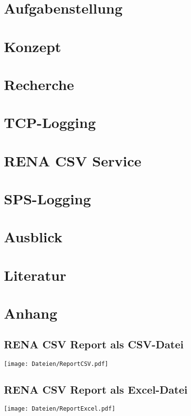 \documentclass[
   ngerman          %
  ,a4paper          %
 ,12pt
]{article} %
\begin{document}
%
%
\section{Aufgabenstellung}

\newpage
\clearpage
\section{Konzept}\label{Konzept}

\newpage
\clearpage
\section{Recherche}

\newpage
\clearpage
\section{TCP-Logging}\label{TCP-Logging}

\newpage
\clearpage
\section{RENA CSV Service}\label{CSV-Report}

\newpage
\clearpage
\section{SPS-Logging}\label{SPS-Logging}

\newpage
\clearpage
\section{Ausblick}\label{Ausblick}

\newpage
\clearpage

%
%
\section{Literatur}

\newpage

%
%
\section{Anhang}
\subsection{RENA CSV Report als CSV-Datei}
\texttt{[image: Dateien/ReportCSV.pdf]}
\subsection{RENA CSV Report als Excel-Datei}
\texttt{[image: Dateien/ReportExcel.pdf]}
\end{document}
